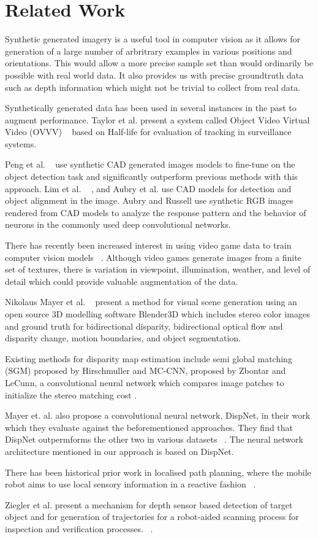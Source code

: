 \section{Related Work}
Synthetic generated imagery is a useful tool in computer vision as it allows for generation of a large number of arbritrary examples in various positions and orientations. This would allow a more precise sample set than would ordinarily be possible with real world data. It also provides us with precise groundtruth data such as depth information which might not be trivial to collect from real data.

Synthetically generated data has been used in several instances in the past to augment performance. Taylor et al. present a system called Object Video Virtual Video (OVVV) ~\cite{Taylor_2007} based on Half-life for evaluation of tracking in surveillance systems. 
 
Peng et al. ~\cite{PengSAS14} use synthetic CAD generated images models to fine-tune on the object detection task and significantly outperform previous methods with this approach. Lim et al. ~\cite{Lim2013} , and Aubry et al. use CAD models for detection and object alignment in the image. Aubry and Russell use synthetic RGB images rendered from CAD models to analyze the response pattern and the behavior of neurons in the commonly used deep convolutional networks.

There has recently been increased interest in using video game data to train computer vision models ~\cite{Shafaei_LS16}. Although video games generate images from a finite set of textures, there is variation in viewpoint, illumination, weather, and level of detail which could provide valuable augmentation of the data. 

Nikolaus Mayer et al. ~\cite{MayerIHFCDB15} present a method for visual scene generation using an open source 3D modelling software Blender3D which includes stereo color images and ground truth for bidirectional disparity, bidirectional optical flow and disparity change, motion boundaries, and object segmentation.

Existing methods for disparity map estimation include semi global matching (SGM) proposed by Hirschmuller \cite{Hirschmuller} and MC-CNN, proposed by Zbontar and LeCunn, a convolutional neural network which compares image patches to initialize the stereo matching cost \cite{ZbontarL15}.

Mayer et. al. also propose a convolutional neural network, DispNet, in their work which they evaluate against the beforementioned approaches. They find that DispNet outpermforms the other two in various datasets ~\cite{MayerIHFCDB15}. The neural network architecture mentioned in our approach is based on DispNet.

There has been historical prior work in localised path planning, where the mobile robot aims to use local sensory information in a reactive fashion ~\cite{Rimon1998}.

Ziegler et al. present a mechanism for depth sensor based detection of target object and for generation of trajectories for a robot-aided scanning process for inspection and verification processes. ~\cite{Ziegler2018}.
